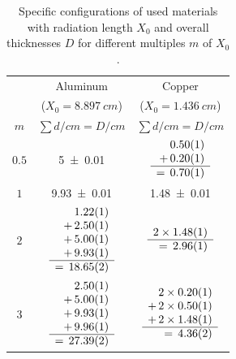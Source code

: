 \documentclass[sn-mathphys-num,iicol]{sn-jnl}
\theoremstyle{thmstyleone}
\theoremstyle{thmstyletwo}
\theoremstyle{thmstylethree}
\begin{document}
\begin{table}\centering
  \renewcommand*{\arraystretch}{1.15}
  \begin{tabular}{c|c|c}
    & Aluminum & Copper \\
    & {\fontsize{7}{5}\selectfont ($X_0=\SI{8.897}{cm}$)} & {\fontsize{7}{5}\selectfont ($X_0=\SI{1.436}{cm}$)} \\\hline
    $m$ & $\sum d/cm = D /cm$ & $\sum d/cm = D /cm$ \\\hline\hline\rule{0pt}{6ex}
    $0.5$ & \num{5\pm 0.01} & $\begin{array}{r}
                \num{0.5\pm 0.01} \\
                +\,\num{0.2\pm 0.01} \\\hline
                =\,\num{0.7\pm 0.01}    
              \end{array}$ \\\hline
    $1$ & \num{9.93\pm 0.01} & \num{1.48\pm 0.01} \\\hline
    $2$ & $\begin{array}{r}
      \num{1.22\pm 0.01} \\
      +\,\num{2.5\pm 0.01} \\
      +\,\num{5\pm 0.01} \\
      +\,\num{9.93\pm 0.01} \\\hline
      =\,\num{18.65\pm 0.02}
    \end{array}$ & $\begin{array}{r}
                      2\times\num{1.48\pm 0.01} \\\hline
                      =\,\num{2.96\pm 0.01}
                    \end{array}$ \\\hline
    $3$ & $\begin{array}{r}
      \num{2.5\pm 0.01} \\
      +\,\num{5\pm 0.01} \\
      +\,\num{9.93\pm 0.01} \\
      +\,\num{9.96\pm 0.01} \\\hline
      =\,\num{27.39\pm 0.02}
    \end{array}$ & $\begin{array}{r}
                      2\times\num{0.2\pm 0.01} \\
                      +\,2\times\num{0.5\pm 0.01} \\
                      +\,2\times\num{1.48\pm 0.01} \\\hline
                      =\,\num{4.36\pm 0.02}
                    \end{array}$ \\\hline
  \end{tabular}\vspace{3mm}
  \caption{Specific configurations of used materials with radiation length $X_0$ and overall thicknesses $D$ for different multiples $m$ of $X_0$.}
  \label{tab:config_materials}
\end{table}
\end{document}
